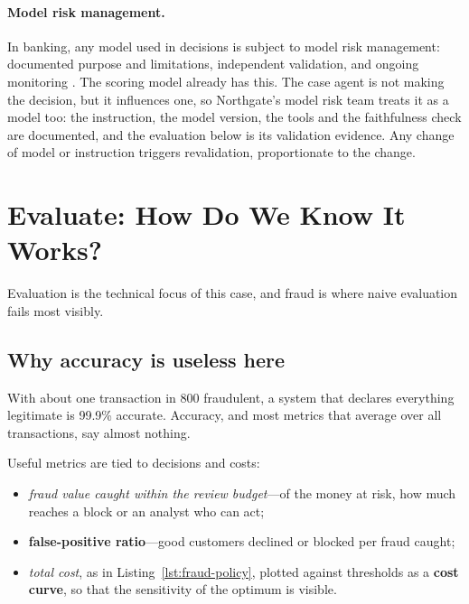 \paragraph{Model risk management.} In banking, any model used in decisions is subject to model risk management: documented purpose and limitations, independent validation, and ongoing monitoring \citep{fed2011sr117}. The scoring model already has this. The case agent is not making the decision, but it influences one, so Northgate's model risk team treats it as a model too: the instruction, the model version, the tools and the faithfulness check are documented, and the evaluation below is its validation evidence. Any change of model or instruction triggers revalidation, proportionate to the change.

\section{Evaluate: How Do We Know It Works?}
\label{sec:fr-evaluate}

Evaluation is the technical focus of this case, and fraud is where naive evaluation fails most visibly.

\subsection{Why accuracy is useless here}

\begin{watchout}
With about one transaction in 800 fraudulent, a system that declares everything legitimate is 99.9\% accurate. Accuracy, and most metrics that average over all transactions, say almost nothing.
\end{watchout} Useful metrics are tied to decisions and costs:
\begin{itemize}[itemsep=1pt]
  \item \emph{fraud value caught within the review budget}---of the money at risk, how much reaches a block or an analyst who can act;
  \item \textbf{false-positive ratio}---good customers declined or blocked per fraud caught;
  \item \emph{total cost}, as in Listing~\ref{lst:fraud-policy}, plotted against thresholds as a \textbf{cost curve}, so that the sensitivity of the optimum is visible.
\end{itemize}

